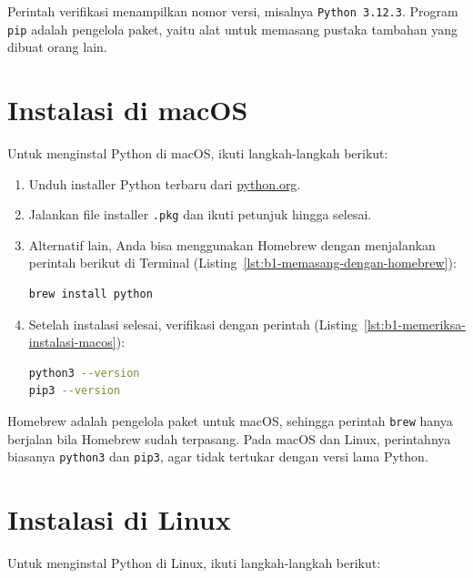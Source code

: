 Perintah verifikasi menampilkan nomor versi, misalnya \texttt{Python 3.12.3}. Program \texttt{pip} adalah pengelola paket, yaitu alat untuk memasang pustaka tambahan yang dibuat orang lain.

\section{Instalasi di macOS}

Untuk menginstal Python di macOS, ikuti langkah-langkah berikut:

\begin{enumerate}
\item Unduh installer Python terbaru dari \href{https://www.python.org/downloads/macos/}{python.org}.
\item Jalankan file installer \texttt{.pkg} dan ikuti petunjuk hingga selesai.
\item Alternatif lain, Anda bisa menggunakan Homebrew dengan menjalankan perintah berikut di Terminal (Listing~\ref{lst:b1-memasang-dengan-homebrew}):
\begin{lstlisting}[language=bash, caption={Memasang Python dengan Homebrew}, label={lst:b1-memasang-dengan-homebrew}]
brew install python
\end{lstlisting}
\item Setelah instalasi selesai, verifikasi dengan perintah (Listing~\ref{lst:b1-memeriksa-instalasi-macos}):
\begin{lstlisting}[language=bash, caption={Memeriksa instalasi Python di macOS}, label={lst:b1-memeriksa-instalasi-macos}]
python3 --version
pip3 --version
\end{lstlisting}
\end{enumerate}

Homebrew adalah pengelola paket untuk macOS, sehingga perintah \texttt{brew} hanya berjalan bila Homebrew sudah terpasang. Pada macOS dan Linux, perintahnya biasanya \texttt{python3} dan \texttt{pip3}, agar tidak tertukar dengan versi lama Python.

\section{Instalasi di Linux}

Untuk menginstal Python di Linux, ikuti langkah-langkah berikut:

